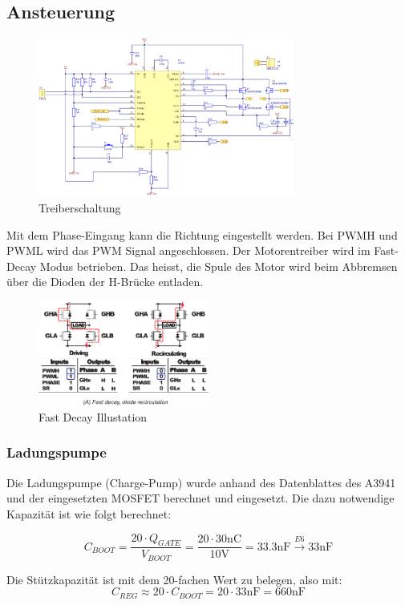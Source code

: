 \subsection{Ansteuerung}

\begin{figure}[h!]
	\centering
	\includegraphics[width=0.75\textwidth]{src/dc/fig/driver_schematic.png}
	\caption{Treiberschaltung}
\end{figure}

\noindent
Mit dem Phase-Eingang kann die Richtung eingestellt werden. Bei PWMH und
PWML wird das PWM Signal angeschlossen. Der Motorentreiber wird im
Fast-Decay Modus betrieben. Das heisst, die Spule des Motor wird beim
Abbremsen über die Dioden der H-Brücke entladen.

\begin{figure}[h!]
	\centering
	\includegraphics[width=0.5\textwidth]{src/dc/fig/decay.pdf}
	\caption[Fast Decay Illustation]{Fast Decay Illustation \cite{Datasheet:A3941}}
\end{figure}

\subsubsection{Ladungspumpe}
Die Ladungspumpe (Charge-Pump) wurde anhand des Datenblattes des A3941
und der eingesetzten MOSFET berechnet und eingesetzt. Die dazu notwendige
Kapazität ist wie folgt berechnet:

\[  
	C_{BOOT}
		= \frac{20 \cdot Q_{GATE}}{V_{BOOT}}
		= \frac{20 \cdot 30\mathrm{nC}}{10\mathrm{V}}
		= 33.3\mathrm{nF} 
		\xrightarrow{E6} 33\mathrm{nF}
\]

\noindent
Die Stützkapazität ist mit dem 20-fachen Wert zu belegen, also mit:
\[
	C_{REG}
		\approx 20 \cdot C_{BOOT}
		= 20 \cdot 33\mathrm{nF}
		= 660\mathrm{nF}
\]
